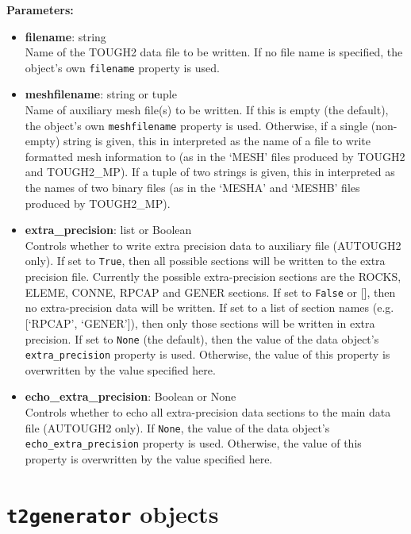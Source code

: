 \textbf{Parameters:}
\begin{itemize}
\item \textbf{filename}: string\\
  Name of the TOUGH2 data file to be written.  If no file name is specified, the object's own \texttt{filename} property is used.
\item \textbf{meshfilename}: string or tuple\\
  Name of auxiliary mesh file(s) to be written.  If this is empty (the default), the object's own \texttt{meshfilename} property is used.  Otherwise, if a single (non-empty) string is given, this in interpreted as the name of a file to write formatted mesh information to (as in the `MESH' files produced by TOUGH2 and TOUGH2\_MP).  If a tuple of two strings is given, this in interpreted as the names of two binary files (as in the `MESHA' and `MESHB' files produced by TOUGH2\_MP).
\item \textbf{extra\_precision}: list or Boolean\\
  Controls whether to write extra precision data to auxiliary file (AUTOUGH2 only).  If set to \texttt{True}, then all possible sections will be written to the extra precision file.  Currently the possible extra-precision sections are the ROCKS, ELEME, CONNE, RPCAP and GENER sections.  If set to \texttt{False} or [], then no extra-precision data will be written.  If set to a list of section names (e.g. [`RPCAP', `GENER']), then only those sections will be written in extra precision.  If set to \texttt{None} (the default), then the value of the data object's \texttt{extra\_precision} property is used.  Otherwise, the value of this property is overwritten by the value specified here.
\item \textbf{echo\_extra\_precision}: Boolean or None\\
  Controls whether to echo all extra-precision data sections to the main data file (AUTOUGH2 only).  If \texttt{None}, the value of the data object's \texttt{echo\_extra\_precision} property is used.  Otherwise, the value of this property is overwritten by the value specified here.
\end{itemize}

\section{\texttt{t2generator} objects}
\label{t2generatorobjects}

